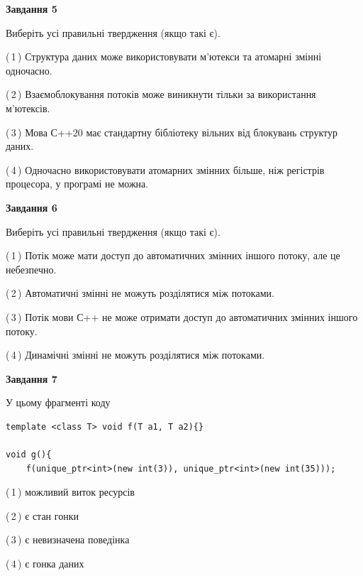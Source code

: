 \documentclass[12pt, ukrainian]{article}
\begin{document}
\begin {large}
{\begin{center}
\textbf{Завдання 5}
\end{center}

Виберіть усі правильні твердження (якщо такі є).\par
\vspace{2mm}

(\,1\,) Структура даних може використовувати м’ютекси та атомарні змінні одночасно.%

(\,2\,) Взаємоблокування потоків може виникнути тільки за використання м’ютексів.%

(\,3\,) Мова С++20 має стандартну бібліотеку вільних від блокувань структур даних.%

(\,4\,) Одночасно використовувати атомарних змінних більше, ніж регістрів процесора, у програмі не можна.%
\newpage


\begin{center}
\textbf{Завдання 6}
\end{center}

Виберіть усі правильні твердження (якщо такі є).\par
\vspace{2mm}

(\,1\,) Потік може мати доступ до автоматичних змінних іншого потоку, але це небезпечно.%

(\,2\,) Автоматичні змінні не можуть розділятися між потоками.%

(\,3\,) Потік мови С++ не може отримати доступ до автоматичних змінних іншого потоку.%

(\,4\,) Динамічні змінні не можуть розділятися між потоками.%


\begin{center}
\textbf{Завдання 7}
\end{center}

У цьому фрагменті коду
\begin{verbatim}
template <class T> void f(T a1, T a2){}

void g(){
    f(unique_ptr<int>(new int(3)), unique_ptr<int>(new int(35)));
\end{verbatim}

(\,1\,) можливий виток ресурсів%

(\,2\,) є стан гонки%

(\,3\,) є невизначена поведінка%

(\,4\,) є гонка даних%

}
\end {large}

\vspace{4mm}
\newpage
\end{document}
